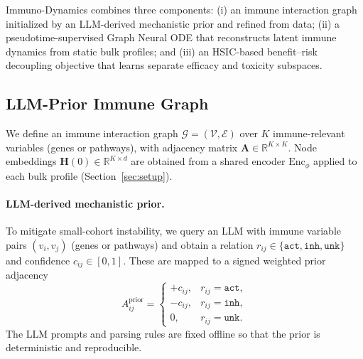 \documentclass{article}
\begin{document}
Immuno-Dynamics combines three components:
(i) an immune interaction graph initialized by an LLM-derived mechanistic prior and refined from data;
(ii) a pseudotime-supervised Graph Neural ODE that reconstructs latent immune dynamics from static bulk profiles; and
(iii) an HSIC-based benefit--risk decoupling objective that learns separate efficacy and toxicity subspaces.

\subsection{LLM-Prior Immune Graph}
\label{subsec:graph}

We define an immune interaction graph $\mathcal{G}=(\mathcal{V},\mathcal{E})$ over $K$ immune-relevant variables
(genes or pathways), with adjacency matrix $\mathbf{A}\in\mathbb{R}^{K\times K}$.
Node embeddings $\mathbf{H}(0)\in\mathbb{R}^{K\times d}$ are obtained from a shared encoder
$\mathrm{Enc}_\phi$ applied to each bulk profile (Section~\ref{sec:setup}).

\paragraph{LLM-derived mechanistic prior.}
To mitigate small-cohort instability, we query an LLM with immune variable pairs $(v_i,v_j)$ (genes or pathways) and obtain a relation
$r_{ij}\in\{\texttt{act},\texttt{inh},\texttt{unk}\}$ and confidence $c_{ij}\in[0,1]$.
These are mapped to a signed weighted prior adjacency
\begin{equation}
A^{\mathrm{prior}}_{ij}=
\begin{cases}
+c_{ij}, & r_{ij}=\texttt{act},\\
-c_{ij}, & r_{ij}=\texttt{inh},\\
0,       & r_{ij}=\texttt{unk}.
\end{cases}
\end{equation}
The LLM prompts and parsing rules are fixed offline so that the prior is deterministic and reproducible.
\end{document}
